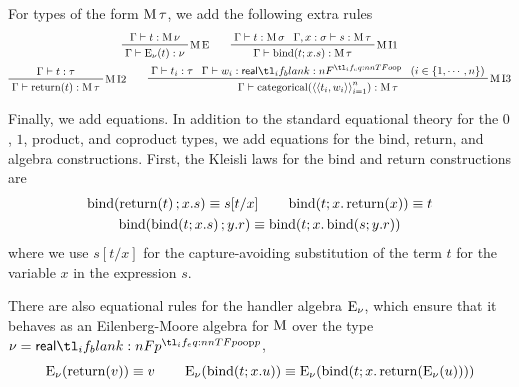\documentclass[11pt,a4paper]{article}
\theoremstyle{definition}
\theoremstyle{remark}
\providecommand{\casubst}[3]{#1[#3/#2]}
\begin{document}
For types of the form \( \opn[b]{M} \tau \), we add the following extra rules
\begin{equation}
  \label{eq:source-language-monad-typing-rules}
  \begin{gathered}
    \prftree[r]{\( \opn[b]{M} \text{E} \)}{
      \Gamma \vdash t : \opn[b]{M} \nu
    }{
      \Gamma \vdash \fn[n]{ \opn[b]{E}_{\nu} }{ t } : \nu
    }
    \qquad
    \prftree[r]{\( \opn[b]{M} \text{I1} \)}{
      \Gamma \vdash t : \opn[b]{M} \sigma
    }{
      \Gamma, x : \sigma \vdash s : \opn[b]{M} \tau
    }{
      \Gamma \vdash
      \fn[n]{ \opn[b]{bind} }{ t; x . s } : \opn[b]{M} \tau
    }
    \\
    \prftree[r]{\( \opn[b]{M} \text{I2} \)}{
      \Gamma \vdash t : \tau
    }{
      \Gamma \vdash \fn[n]{ \opn[b]{return} }{ t }: \opn[b]{M} \tau
    }
    \qquad
    \prftree[r]{\( \opn[b]{M} \text{I3} \)}{
      \Gamma \vdash t_{i}: \tau
    }{
      \Gamma \vdash w_{i}: \srcreal
    }{
      \left( i \in \left\{ 1, \cdots, n \right\} \right)
    }
    {
      \Gamma \vdash
      \fn[n]{ \opn[b]{categorical} }{
        \tuple{
          \tuple{t_{i}, w_{i}}
        }_{i = 1}^{n}
      } :
      \opn[b]{M} \tau
    }
  \end{gathered}
\end{equation}

Finally, we add equations. In addition to the standard equational theory for the \( 0 \), \( 1 \), product, and coproduct types, we add equations for the bind, return, and algebra constructions. First, the Kleisli laws for the bind and return constructions are
\begin{equation}
  \label{eq:source-language-kleisli-laws}
  \begin{gathered}
    \fn[n]{ \opn[b]{bind} }{ \fn[n]{ \opn[b]{return} }{ t }; x . s }
    \equiv
    \casubst{s}{x}{t}
    \qquad
    \fn[n]{ \opn[b]{bind} }{ t; x . \fn[n]{ \opn[b]{return} }{ x } }
    \equiv t
    \\
    \fn[n]{ \opn[b]{bind} }{
      \fn[n]{ \opn[b]{bind} }{ t; x . s };
      y . r
    }
    \equiv
    \fn[n]{ \opn[b]{bind} }{
      t;
      x . \fn[n]{ \opn[b]{bind} }{ s ; y . r }
    }
  \end{gathered}
\end{equation}
where we use \( \casubst{s}{x}{t} \) for the capture-avoiding substitution of the term \( t \) for the variable \( x \) in the expression \( s \).

There are also equational rules for the handler algebra \( \opn[b]{E}_{\nu} \), which ensure that it behaves as an Eilenberg-Moore algebra for \( \opn[b]{M} \) over the type \( \nu = \srcreal[p] \),
\begin{equation}
  \label{eq:source-language-eilenberg-moore-algebra-laws}
  \fn[n]{ \opn[b]{E}_{\nu} }{ \fn[n]{ \opn[b]{return} }{ v } }
  \equiv v
  \qquad
  \fn[n]{ \opn[b]{E}_{\nu} }{ \fn[n]{ \opn[b]{bind} }{ t; x . u } }
  \equiv
  \fn[n]{ \opn[b]{E}_{\nu} }{
    \fn[n]{ \opn[b]{bind} }{
      t; x . \fn[n]{ \opn[b]{return} }{ \fn[n]{ \opn[b]{E}_{\nu} }{ u } }
    }
  }
\end{equation}
\end{document}
